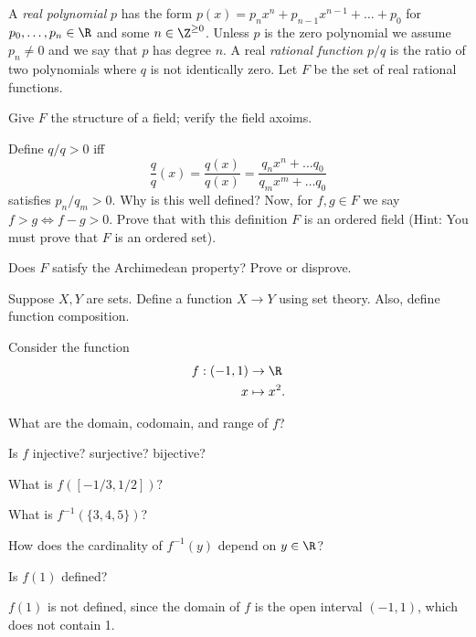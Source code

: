 \documentclass{assignment}
\begin{document}
\begin{question}[2]
  A \emph{real polynomial} $p$ has the form $p(x) = p_nx^n + p_{n-1}x^{n-1} + \ldots + p_0$ for $p_0,
\ldots, p_n\in\R$ and some $n\in\Z^{\geq0}$. Unless $p$ is the zero polynomial we assume $p_n\neq 0$ 
and we say that $p$ has degree $n$. A real \emph{rational function} $p/q$ is the ratio of two polynomials
where $q$ is not identically zero. Let $F$ be the set of real rational functions. \\

\begin{qparts}
  \item Give $F$ the structure of a field; verify the field axoims.
  \item Define $q/q >0$ iff $$\frac{q}{q}(x) = \frac{q(x)}{q(x)} = \frac{q_nx^n + \ldots q_0}{q_mx^m
 + \ldots q_0}$$ satisfies $p_n/q_m > 0.$ Why is this well defined? Now, for $f,g\in F$ we say $f > g
\iff f- g > 0$. Prove that with this definition $F$ is an ordered field (Hint: You must prove that $F$
is an ordered set).
  \item Does $F$ satisfy the Archimedean property? Prove or disprove.
\end{qparts}
\end{question}



\begin{question}[3]
  Suppose $X,Y$ are sets. Define a function $X \to Y$ using set theory. Also, define function composition.
\end{question}



\begin{question}[4]
  Consider the function 
  \begin{align*}
    f: (-1, 1) &\to \R \\
             x &\mapsto x^2.
  \end{align*}
  \begin{qparts}
    \item What are the domain, codomain, and range of $f$? 
    \item Is $f$ injective? surjective? bijective?
    \item What is $f([-1/3, 1/2])?$
    \item What is $f^{-1}(\{3,4,5\})$?
    \item How does the cardinality of $f^{-1}(y)$ depend on $y\in\R$?
    \item Is $f(1)$ defined?
  \end{qparts}
\end{question}
\begin{qparts}
  \item $f(1)$ is not defined, since the domain of $f$ is the open interval $(-1, 1)$, which does not
        contain 1.
\end{qparts}
\end{document}

